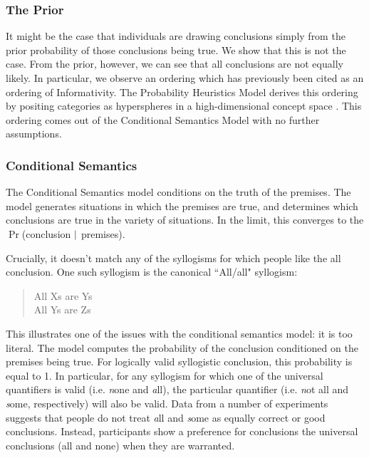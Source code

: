 \documentclass[10pt,letterpaper]{article}
\begin{document}
\subsubsection{The Prior}
It might be the case that individuals are drawing conclusions simply from the prior probability of those conclusions being true. We show that this is not the case. From the prior, however, we can see that all conclusions are not equally likely. In particular, we observe an ordering which has previously been cited as an ordering of Informativity. The Probability Heuristics Model derives this ordering by positing categories as hyperspheres in a high-dimensional concept space \cite{Chater1999}. This ordering comes out of the Conditional Semantics Model with no further assumptions.

\subsubsection{Conditional Semantics}

The Conditional Semantics model conditions on the truth of the premises. The model generates situations in which the premises are true, and determines which conclusions are true in the variety of situations. In the limit, this converges to the $\Pr$(conclusion $\arrowvert$ premises). 

 Crucially, it doesn't match any of the syllogisms for which people like the all conclusion. One such syllogism is the canonical ``All/all" syllogism:

\begin{quote}
All Xs are Ys \\
All Ys are Zs \\
\end{quote}

This illustrates one of the issues with the conditional semantics model: it is too literal. The model computes the probability of the conclusion conditioned on the premises being true. For logically valid syllogistic conclusion, this probability is equal to 1. In particular, for any syllogism for which one of the universal quantifiers is valid (i.e. {\emph none} and {\emph all}), the particular quantifier (i.e. {\emph not all} and {\emph some}, respectively) will also be valid. Data from a number of experiments suggests that people do not treat {\emph all} and {\emph some} as equally correct or good conclusions. Instead, participants show a preference for conclusions the universal conclusions (all and none) when they are warranted. 
\end{document}
